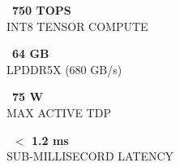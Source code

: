 \documentclass[10pt,a4paper]{article}
\begin{document}
\begin{minipage}[t]{0.235\textwidth}
  \begin{tcolorbox}[colback=BgLight,colframe=LineColor,halign=center,top=5pt,bottom=5pt]
    \textcolor{AccentDark}{\faMicrochip\ \large\bfseries 750 TOPS}\\[2pt]
    \textcolor{TextMuted}{\tiny INT8 TENSOR COMPUTE}
  \end{tcolorbox}
\end{minipage}%
\hfill
\begin{minipage}[t]{0.235\textwidth}
  \begin{tcolorbox}[colback=BgLight,colframe=LineColor,halign=center,top=5pt,bottom=5pt]
    \textcolor{AccentDark}{\faMemory\ \large\bfseries 64 GB}\\[2pt]
    \textcolor{TextMuted}{\tiny LPDDR5X (680 GB/s)}
  \end{tcolorbox}
\end{minipage}%
\hfill
\begin{minipage}[t]{0.235\textwidth}
  \begin{tcolorbox}[colback=BgLight,colframe=LineColor,halign=center,top=5pt,bottom=5pt]
    \textcolor{AccentDark}{\faBolt\ \large\bfseries 75 W}\\[2pt]
    \textcolor{TextMuted}{\tiny MAX ACTIVE TDP}
  \end{tcolorbox}
\end{minipage}%
\hfill
\begin{minipage}[t]{0.235\textwidth}
  \begin{tcolorbox}[colback=BgLight,colframe=LineColor,halign=center,top=5pt,bottom=5pt]
    \textcolor{AccentDark}{\faStopwatch\ \large\bfseries $<$ 1.2 ms}\\[2pt]
    \textcolor{TextMuted}{\tiny SUB-MILLISECORD LATENCY}
  \end{tcolorbox}
\end{minipage}

\vspace{6pt}
\end{document}
